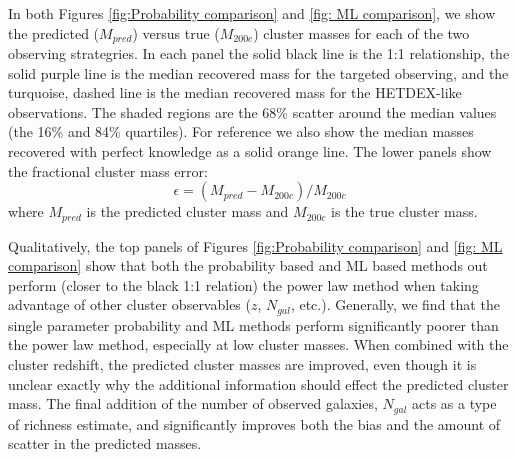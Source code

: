 \documentclass[fleqn,usenatbib]{mnras}
\begin{document}
In both Figures \ref{fig:Probability comparison} and \ref{fig: ML comparison}, we show the predicted ($M_{pred}$) versus true ($M_{200c}$) cluster masses for each of the two observing strategries. In each panel the solid black line is the 1:1 relationship, the solid purple line is the median recovered mass for the targeted observing, and the turquoise, dashed line is the median recovered mass for the HETDEX-like observations. The shaded regions are the 68\% scatter around the median values (the 16\% and 84\% quartiles). For reference we also show the median masses recovered with perfect knowledge as a solid orange line. The lower panels show the fractional cluster mass error: 
\begin{equation}\label{eq: fractional error}
	\epsilon = (M_{pred} - M_{200c})/M_{200c}
\end{equation}
where $M_{pred}$ is the predicted cluster mass and $M_{200c}$ is the true cluster mass.

Qualitatively, the top panels of Figures \ref{fig:Probability comparison} and \ref{fig: ML comparison} show that both the probability based and ML based methods out perform (closer to the black 1:1 relation) the power law method when taking advantage of other cluster observables ($z$, $N_{gal}$, etc.). Generally, we find that the single parameter probability and ML methods perform significantly poorer than the power law method, especially at low cluster masses. When combined with the cluster redshift, the predicted cluster masses are improved, even though it is unclear exactly why the additional information should effect the predicted cluster mass. The final addition of the number of observed galaxies, $N_{gal}$ acts as a type of richness estimate, and significantly improves both the bias and the amount of scatter in the predicted masses.


\end{document}
